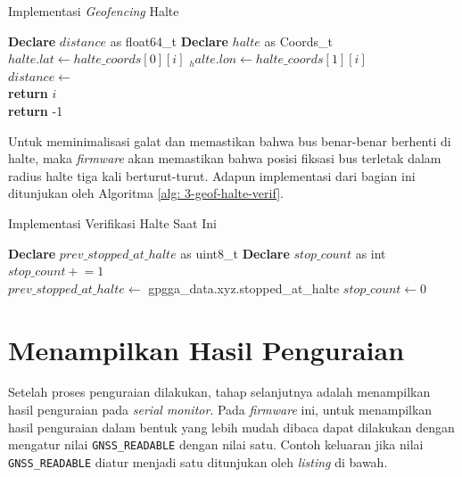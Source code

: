 \begin{algorithm}[H]
	\caption{Implementasi \textit{Geofencing} Halte}
	\label{alg: 3-geof-halte}
	\begin{algorithmic}[1]
		\State \textbf{Declare} $distance$ as float64\_t
		\State \textbf{Declare} $halte$ as Coords\_t
		\\
			\State $halte.lat \gets halte\_coords[0][i]$
			\State $_halte.lon \gets halte\_coords[1][i]$
			\\
			\State $distance \gets$ 
			\\
				\State \textbf{return} $i$
			\EndIf
		\EndFor
		\\
		\State \textbf{return} -1
	\EndFunction
	\end{algorithmic}
\end{algorithm}

Untuk meminimalisasi galat dan memastikan bahwa bus benar-benar berhenti di halte, maka \textit{firmware} akan memastikan bahwa posisi fiksasi bus terletak dalam radius halte tiga kali berturut-turut. Adapun implementasi dari bagian ini ditunjukan oleh Algoritma \ref{alg: 3-geof-halte-verif}.

\begin{algorithm}[H]
	\caption{Implementasi Verifikasi Halte Saat Ini}
	\label{alg: 3-geof-halte-verif}
	\begin{algorithmic}[1]
	\State \textbf{Declare} $prev\_stopped\_at\_halte$ as uint8\_t
	\State \textbf{Declare} $stop\_count$ as int
	\\
			\State $stop\_count \mathrel{+}= 1$
			\\
				\State {}
				\State {}
			\EndIf
		\Else
			\State $prev\_stopped\_at\_halte \gets$ gpgga\_data.xyz.stopped\_at\_halte
			\State $stop\_count \gets 0$
		\EndIf
	\EndIf		
	\end{algorithmic}
\end{algorithm}

\section{Menampilkan Hasil Penguraian}
Setelah proses penguraian dilakukan, tahap selanjutnya adalah menampilkan hasil penguraian pada \textit{serial monitor}. Pada \textit{firmware} ini, untuk menampilkan hasil penguraian dalam bentuk yang lebih mudah dibaca dapat dilakukan dengan mengatur nilai \texttt{GNSS\_READABLE} dengan nilai satu. Contoh keluaran jika nilai \texttt{GNSS\_READABLE} diatur menjadi satu ditunjukan oleh \textit{listing} di bawah.

